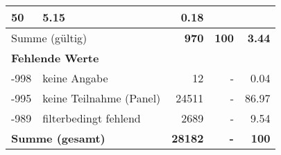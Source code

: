 \begin{longtable}{lXrrr}
       \num{50} &
       \num[round-mode=places,round-precision=2]{5,15} &
         \num[round-mode=places,round-precision=2]{0,18} \\
     \midrule
     \multicolumn{2}{l}{Summe (gültig)} &
       \textbf{\num{970}} &
     \textbf{100} &
       \textbf{\num[round-mode=places,round-precision=2]{3,44}} \\
     \multicolumn{5}{l}{\textbf{Fehlende Werte}}\\
       -998 &
       keine Angabe &
         \num{12} &
        - &
         \num[round-mode=places,round-precision=2]{0,04} \\
       -995 &
       keine Teilnahme (Panel) &
         \num{24511} &
        - &
         \num[round-mode=places,round-precision=2]{86,97} \\
       -989 &
       filterbedingt fehlend &
         \num{2689} &
        - &
         \num[round-mode=places,round-precision=2]{9,54} \\
     \midrule
     \multicolumn{2}{l}{\textbf{Summe (gesamt)}} &
          \textbf{\num{28182}} &
        \textbf{-} &
        \textbf{100} \\
     \bottomrule
     \end{longtable}
     
